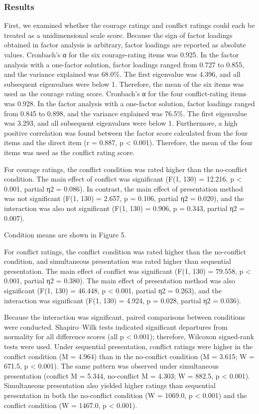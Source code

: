 \subsubsection{Results}\label{results}

First, we examined whether the courage ratings and conflict ratings
could each be treated as a unidimensional scale score. Because the sign
of factor loadings obtained in factor analysis is arbitrary, factor
loadings are reported as absolute values. Cronbach's α for the six
courage-rating items was 0.925. In the factor analysis with a one-factor
solution, factor loadings ranged from 0.727 to 0.855, and the variance
explained was 68.0\%. The first eigenvalue was 4.396, and all subsequent
eigenvalues were below 1. Therefore, the mean of the six items was used
as the courage rating score. Cronbach's α for the four conflict-rating
items was 0.928. In the factor analysis with a one-factor solution,
factor loadings ranged from 0.845 to 0.898, and the variance explained
was 76.5\%. The first eigenvalue was 3.293, and all subsequent
eigenvalues were below 1. Furthermore, a high positive correlation was
found between the factor score calculated from the four items and the
direct item (r = 0.887, p \textless{} 0.001). Therefore, the mean of the
four items was used as the conflict rating score.

For courage ratings, the conflict condition was rated higher than the
no-conflict condition. The main effect of conflict was significant (F(1,
130) = 12.216, p \textless{} 0.001, partial η2 = 0.086). In contrast,
the main effect of presentation method was not significant (F(1, 130) =
2.657, p = 0.106, partial η2 = 0.020), and the interaction was also not
significant (F(1, 130) = 0.906, p = 0.343, partial η2 = 0.007).

Condition means are shown in Figure 5.

For conflict ratings, the conflict condition was rated higher than the
no-conflict condition, and simultaneous presentation was rated higher
than sequential presentation. The main effect of conflict was
significant (F(1, 130) = 79.558, p \textless{} 0.001, partial η2 =
0.380). The main effect of presentation method was also significant
(F(1, 130) = 46.448, p \textless{} 0.001, partial η2 = 0.263), and the
interaction was significant (F(1, 130) = 4.924, p = 0.028, partial η2 =
0.036).

Because the interaction was significant, paired comparisons between
conditions were conducted. Shapiro--Wilk tests indicated significant
departures from normality for all difference scores (all p \textless{}
0.001); therefore, Wilcoxon signed-rank tests were used. Under
sequential presentation, conflict ratings were higher in the conflict
condition (M = 4.964) than in the no-conflict condition (M = 3.615; W =
671.5, p \textless{} 0.001). The same pattern was observed under
simultaneous presentation (conflict M = 5.344, no-conflict M = 4.303; W
= 882.5, p \textless{} 0.001). Simultaneous presentation also yielded
higher ratings than sequential presentation in both the no-conflict
condition (W = 1069.0, p \textless{} 0.001) and the conflict condition
(W = 1467.0, p \textless{} 0.001).

